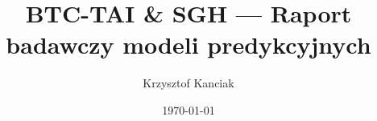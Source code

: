 \titlehead{\centering\large\bfseries BTC-TAI \& SGH — Raport badawczy modeli predykcyjnych}
\subject{Projekt BTC-TAI (KNC-376..384) + Program SGH × PKO BP}
\title{BTC-TAI \& SGH — Raport badawczy modeli predykcyjnych}
\author{Krzysztof Kanciak}
\date{\today}
\publishers{}
\maketitle
\thispagestyle{empty}
\newpage
\setcounter{page}{1}
\tableofcontents
\newpage
